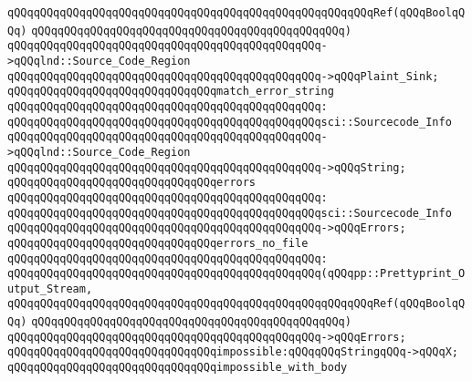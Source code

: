 \verb|qQQqqQQqqQQqqQQqqQQqqQQqqQQqqQQqqQQqqQQqqQQqqQQqqQQqqQQqRef(qQQqBoolqQQq)|\newline
\verb|qQQqqQQqqQQqqQQqqQQqqQQqqQQqqQQqqQQqqQQqqQQqqQQq)|\newline
\verb|qQQqqQQqqQQqqQQqqQQqqQQqqQQqqQQqqQQqqQQqqQQqqQQq->qQQqlnd::Source_Code_Region|\newline
\verb|qQQqqQQqqQQqqQQqqQQqqQQqqQQqqQQqqQQqqQQqqQQqqQQq->qQQqPlaint_Sink;|\newline
\newline
\verb|qQQqqQQqqQQqqQQqqQQqqQQqqQQqqQQqmatch_error_string|\newline
\verb|qQQqqQQqqQQqqQQqqQQqqQQqqQQqqQQqqQQqqQQqqQQqqQQq:|\newline
\verb|qQQqqQQqqQQqqQQqqQQqqQQqqQQqqQQqqQQqqQQqqQQqqQQqsci::Sourcecode_Info|\newline
\verb|qQQqqQQqqQQqqQQqqQQqqQQqqQQqqQQqqQQqqQQqqQQqqQQq->qQQqlnd::Source_Code_Region|\newline
\verb|qQQqqQQqqQQqqQQqqQQqqQQqqQQqqQQqqQQqqQQqqQQqqQQq->qQQqString;|\newline
\newline
\verb|qQQqqQQqqQQqqQQqqQQqqQQqqQQqqQQqerrors|\newline
\verb|qQQqqQQqqQQqqQQqqQQqqQQqqQQqqQQqqQQqqQQqqQQqqQQq:|\newline
\verb|qQQqqQQqqQQqqQQqqQQqqQQqqQQqqQQqqQQqqQQqqQQqqQQqsci::Sourcecode_Info|\newline
\verb|qQQqqQQqqQQqqQQqqQQqqQQqqQQqqQQqqQQqqQQqqQQqqQQq->qQQqErrors;|\newline
\newline
\verb|qQQqqQQqqQQqqQQqqQQqqQQqqQQqqQQqerrors_no_file|\newline
\verb|qQQqqQQqqQQqqQQqqQQqqQQqqQQqqQQqqQQqqQQqqQQqqQQq:|\newline
\verb|qQQqqQQqqQQqqQQqqQQqqQQqqQQqqQQqqQQqqQQqqQQqqQQq(qQQqpp::Prettyprint_Output_Stream,|\newline
\verb|qQQqqQQqqQQqqQQqqQQqqQQqqQQqqQQqqQQqqQQqqQQqqQQqqQQqqQQqRef(qQQqBoolqQQq)|\newline
\verb|qQQqqQQqqQQqqQQqqQQqqQQqqQQqqQQqqQQqqQQqqQQqqQQq)|\newline
\verb|qQQqqQQqqQQqqQQqqQQqqQQqqQQqqQQqqQQqqQQqqQQqqQQq->qQQqErrors;|\newline
\newline
\verb|qQQqqQQqqQQqqQQqqQQqqQQqqQQqqQQqimpossible:qQQqqQQqStringqQQq->qQQqX;|\newline
\newline
\verb|qQQqqQQqqQQqqQQqqQQqqQQqqQQqqQQqimpossible_with_body|\newline

